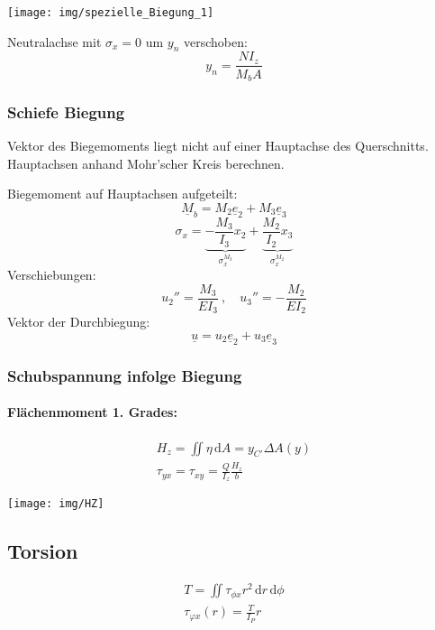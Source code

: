 \documentclass{article}
\newcommand{\ud}{\,\mathrm{d}}
\begin{document}
\begin{multicols*}{4}
					\begin{center}
						\texttt{[image: img/spezielle\_Biegung\_1]}
					\end{center}
					
					Neutralachse mit $\sigma_x = 0$ um $y_n$ verschoben:
					\[
						y_n = \frac{N I_z}{M_b A}
					\]
				\subsubsection{Schiefe Biegung} %
					Vektor des Biegemoments liegt nicht auf einer Hauptachse des Querschnitts. Hauptachsen anhand Mohr'scher Kreis berechnen.
					
					Biegemoment auf Hauptachsen aufgeteilt:
					\[
						\underline{M}_b = M_2 \underline{e}_2 + M_3 \underline{e}_3
					\]
					\[
						\sigma_x = \underbrace{- \frac{M_3}{I_3}x_2}_{\sigma_x^{M_3}} + \underbrace{\frac{M_2}{I_2}x_3}_{\sigma_x^{M_2}}
					\]
					Verschiebungen: \[
						u_2'' = \frac{M_3}{EI_3} \ ,\quad
						u_3'' = - \frac{M_2}{EI_2}
					\]
					Vektor der Durchbiegung: \[
						\underline{u} = u_2\underline{e}_2 + u_3\underline{e}_3
					\]
				\subsubsection{Schubspannung infolge Biegung} %
					\paragraph{Flächenmoment 1. Grades:} %
						\begin{gather*}
							H_z = \iint \eta \ud A = y_{C'} \Delta A(y) \\
							\tau_{yx} = \tau_{xy} = \frac{Q}{I_z} \frac{H_z}{b}
						\end{gather*}
						\begin{center}
							\texttt{[image: img/HZ]}
						\end{center}
			\subsection{Torsion} %
				\begin{gather*}
					T = \iint \tau_{\phi x} r^2 \ud r \ud \phi
					\\
					\tau_{\varphi x}(r) = \frac{T}{I_P} r
				\end{gather*}
				

\end{multicols*}
\end{document}
